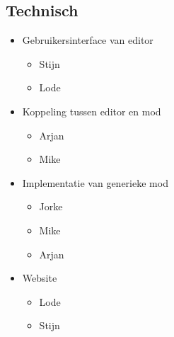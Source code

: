 \documentclass{article}
\begin{document}
	\subsection{Technisch}
	\begin{itemize}
		\item Gebruikersinterface van editor
		\begin{itemize}
			\item Stijn
			\item Lode
		\end{itemize}
		\item Koppeling tussen editor en mod
		\begin{itemize}
			\item Arjan
			\item Mike
		\end{itemize}
		\item Implementatie van generieke mod
		\begin{itemize}
			\item Jorke
			\item Mike
			\item Arjan
		\end{itemize}
		\item Website
		\begin{itemize}
			\item Lode
			\item Stijn
		\end{itemize}
	\end{itemize}
\end{document}
